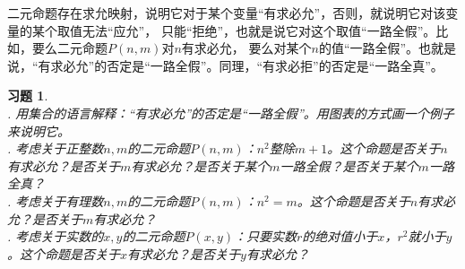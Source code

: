 \documentclass[12pt,UTF8]{ctexbook}
\newtheorem{xt}{习题}[section]
\begin{document}
二元命题存在求允映射，说明它对于某个变量“有求必允”，否则，就说明它对该变量的某个取值无法“应允”，
只能“拒绝”，也就是说它对这个取值“一路全假”。比如，要么二元命题$P(n,m)$对$n$有求必允，
要么对某个$n$的值“一路全假”。也就是说，“有求必允”的否定是“一路全假”。同理，“有求必拒”的否定是“一路全真”。

\begin{xt}
    \mbox{}\\
    . 用集合的语言解释：“有求必允”的否定是“一路全假”。用图表的方式画一个例子来说明它。\\
    . 考虑关于正整数$n, m$的二元命题$P(n,m)$：$n^2$整除$m + 1$。这个命题是否关于$n$有求必允？是否关于$m$有求必允？是否关于某个$m$一路全假？是否关于某个$m$一路全真？\\
    . 考虑关于有理数$n, m$的二元命题$P(n,m)$：$n^2 = m$。这个命题是否关于$n$有求必允？是否关于$m$有求必允？\\
    . 考虑关于实数的$x, y$的二元命题$P(x, y)$：只要实数$r$的绝对值小于$x$，$r^2$就小于$y$。这个命题是否关于$x$有求必允？是否关于$y$有求必允？
\end{xt}
\end{document}
